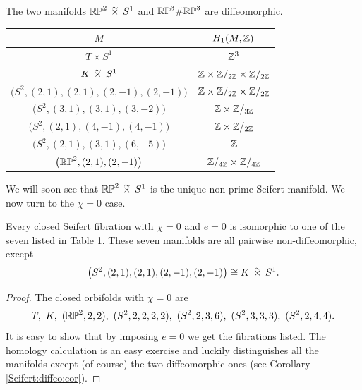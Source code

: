 \begin{ex} The two manifolds $\matRP^2\timtil S^1$ and $\mathbb{RP}^3\#\mathbb{RP}^3$ are diffeomorphic.
\end{ex}

\begin{table}
\begin{center}
\begin{tabular}{c||c}
\phantom{\Big|} $M$ & $H_1(M,\mathbb{Z})$ \\
\hline \hline
\phantom{\Big|} $ T \times S^1$ & $\mathbb{Z}^3$ \\ 
\phantom{\big|} $ K \timtil S^1$ & $\mathbb{Z} \times \mathbb{Z}/_{2\mathbb{Z}} \times \mathbb{Z}/_{2\mathbb{Z}}$ \\
\phantom{\Big|} $ \big(S^2, (2,1), (2,1), (2,-1), (2,-1) \big) $ & $\mathbb{Z} \times \mathbb{Z}/_{2\mathbb{Z}} \times \mathbb{Z}/_{2\mathbb{Z}}$ \\
\phantom{\big|} $ \big(S^2, (3,1), (3,1), (3,-2) \big) $ & $\mathbb{Z} \times \mathbb{Z}/_{3\mathbb{Z}} $ \\
\phantom{\Big|} $ \big(S^2, (2,1), (4,-1), (4,-1) \big) $ & $\mathbb{Z} \times \mathbb{Z}/_{2\mathbb{Z}} $ \\
\phantom{\big|} $ \big(S^2, (2,1), (3,1), (6,-5) \big) $ & $\mathbb{Z}$ \\
\phantom{\Big|} $ \big(\mathbb{RP}^2, (2,1), (2,-1)\big) $ & $\mathbb{Z}/_{4\mathbb{Z}} \times \mathbb{Z}/_{4\mathbb{Z}}$
\end{tabular}
\vspace{.2 cm}
\label{seven:table}
\end{center}
\end{table}

We will soon see that $\matRP^2 \timtil S^1$ is the unique non-prime Seifert manifold. We now turn to the $\chi=0$ case.

\begin{prop} \label{chi:zero:prop}
Every closed Seifert fibration with $\chi = 0$ and $e=0$ is isomorphic to one of the seven listed in Table \ref{seven:table}. These seven manifolds are all pairwise non-diffeomorphic, except
$$\big(S^2,(2,1),(2,1),(2,-1),(2,-1)\big) \isom K\timtil S^1.$$
\end{prop}
\begin{proof}
The closed orbifolds with $\chi =0$ are 
$$T,\ K,\ (\mathbb{RP}^2, 2,2),\ (S^2, 2,2,2,2),\ (S^2,2,3,6),\ (S^2,3,3,3),\ (S^2,2,4,4).$$ 
It is easy to show that by imposing $e=0$ we get the fibrations listed.
The homology calculation is an easy exercise and luckily distinguishes all the manifolds except (of course) the two diffeomorphic ones (see Corollary \ref{Seifert:diffeo:cor}).
\end{proof}

